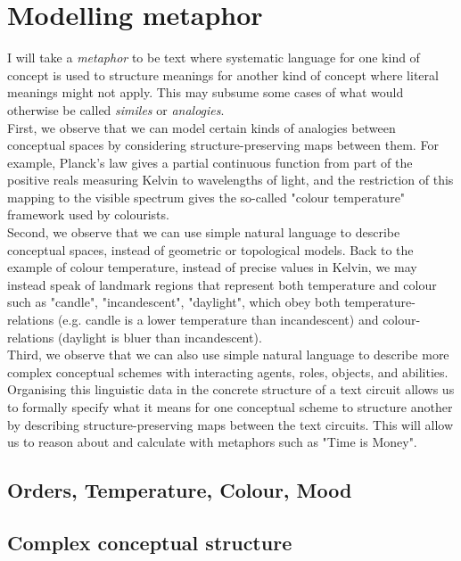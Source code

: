 \section{Modelling metaphor}

I will take a \emph{metaphor} to be text where systematic language for one kind of concept is used to structure meanings for another kind of concept where literal meanings might not apply. This may subsume some cases of what would otherwise be called \emph{similes} or \emph{analogies}.\\

 First, we observe that we can model certain kinds of analogies between conceptual spaces by considering structure-preserving maps between them. For example, Planck's law gives a partial continuous function from part of the positive reals measuring Kelvin to wavelengths of light, and the restriction of this mapping to the visible spectrum gives the so-called "colour temperature" framework used by colourists.\\

Second, we observe that we can use simple natural language to describe conceptual spaces, instead of geometric or topological models. Back to the example of colour temperature, instead of precise values in Kelvin, we may instead speak of landmark regions that represent both temperature and colour such as "candle", "incandescent", "daylight", which obey both temperature-relations (e.g. candle is a lower temperature than incandescent) and colour-relations (daylight is bluer than incandescent).\\

Third, we observe that we can also use simple natural language to describe more complex conceptual schemes with interacting agents, roles, objects, and abilities. Organising this linguistic data in the concrete structure of a text circuit allows us to formally specify what it means for one conceptual scheme to structure another by describing structure-preserving maps between the text circuits. This will allow us to reason about and calculate with metaphors such as "Time is Money".


\subsection{Orders, Temperature, Colour, Mood}

\subsection{Complex conceptual structure}


